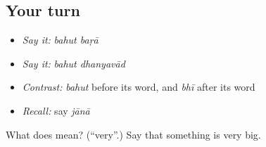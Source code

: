 \subsection*{Your turn}
\begin{itemize}
\raggedright
  \item \emph{Say it:} \emph{bahut baṛā}
  \item \emph{Say it:} \emph{bahut dhanyavād}
  \item \emph{Contrast:} \emph{bahut} before its word, and \emph{bhī} after its word
  \item \emph{Recall:} say \emph{jānā}
\end{itemize}

\begin{tcolorbox}[breakable,colback=teal!4,colframe=teal!35!black,title={Before you move on}]
What does  mean? (\textquotedblleft{}very\textquotedblright{}.) Say that something is very big.
\end{tcolorbox}
